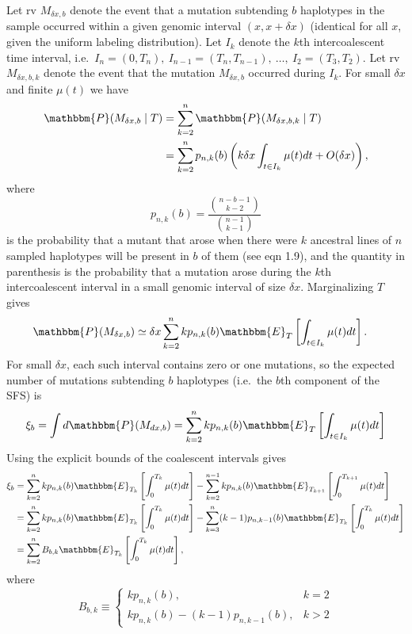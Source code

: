 \documentclass[11pt]{article}
\begin{document}
Let rv $M_{\delta x, b}$ denote the event that a mutation subtending $b$ haplotypes in the sample occurred within a given genomic interval $(x,x+\delta x)$ (identical for all $x$, given the uniform labeling distribution).
Let $I_k$ denote the $k$th intercoalescent time interval, i.e.\ $I_n = (0, T_n),\ I_{n-1} = (T_n, T_{n-1}),\ \dots,\ I_2 = (T_3, T_2)$.
Let rv $M_{\delta x, b, k}$ denote the event that the mutation $M_{\delta x, b}$ occurred during $I_k$.
For small $\delta x$ and finite $\mu(t)$ we have
\begin{align*}
\mathbbm{P}(M_{\delta x, b}\mid T) &= \sum_{k=2}^n \mathbbm{P}(M_{\delta x, b, k}\mid T)\\
&= \sum_{k=2}^n p_{n,k}(b)\left(k\delta x\int_{t\in I_k}\mu(t)dt + O(\delta x)\right),
\end{align*}
where
\begin{equation}
\label{eqn:p}
p_{n,k}(b) = \frac{\binom{n-b-1}{k-2}}{\binom{n-1}{k-1}}
\end{equation}
is the probability that a mutant that arose when there were $k$ ancestral lines of $n$ sampled haplotypes will be present in $b$ of them (see \cite{Griffiths1998-qf} eqn 1.9), and the quantity in parenthesis is the probability that a mutation arose during the $k$th intercoalescent interval in a small genomic interval of size $\delta x$.
Marginalizing $T$ gives
\begin{align*}
\mathbbm{P}(M_{\delta x, b}) &\simeq \delta x\sum_{k=2}^n k p_{n,k}(b) \mathbbm{E}_T\left[\int_{t\in I_k}\mu(t)dt\right].
\end{align*}
For small $\delta x$, each such interval contains zero or one mutations, so the expected number of mutations subtending $b$ haplotypes (i.e.\ the $b$th component of the SFS) is
\[
\xi_b = \int d\mathbbm{P}(M_{dx, b}) = \sum_{k=2}^n k p_{n,k}(b)\mathbbm{E}_T\left[\int_{t\in I_k}\mu(t)dt\right]\nonumber
\]
Using the explicit bounds of the coalescent intervals gives
\begin{align}
\label{eqn:xi}
\xi_b &= \sum_{k=2}^n k p_{n,k}(b) \mathbbm{E}_{T_k}\left[\int_0^{T_k}\mu(t)dt\right] - \sum_{k=2}^{n-1} k p_{n,k}(b) \mathbbm{E}_{T_{k+1}}\left[\int_0^{T_{k+1}}\mu(t)dt\right]\nonumber\\
&= \sum_{k=2}^n k p_{n,k}(b) \mathbbm{E}_{T_k}\left[\int_0^{T_k}\mu(t)dt\right] - \sum_{k=3}^{n} (k-1) p_{n,k-1}(b) \mathbbm{E}_{T_{k}}\left[\int_0^{T_k}\mu(t)dt\right]\nonumber\\
&= \sum_{k=2}^n B_{b,k} \mathbbm{E}_{T_k}\left[\int_0^{T_k}\mu(t)dt\right],
\end{align}
where
\begin{equation}
\label{eqn:B}
B_{b,k}\equiv
\begin{cases}
k p_{n,k}(b),& k=2\\
k p_{n,k}(b) - (k-1) p_{n,k-1}(b),& k > 2
\end{cases}
\end{equation}
\end{document}
